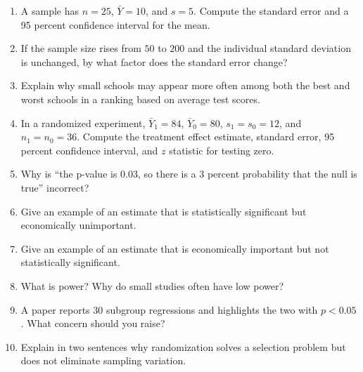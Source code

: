 \begin{enumerate}
  \item A sample has $n=25$, $\bar{Y}=10$, and $s=5$. Compute the standard
  error and a 95 percent confidence interval for the mean.
  \item If the sample size rises from $50$ to $200$ and the individual standard
  deviation is unchanged, by what factor does the standard error change?
  \item Explain why small schools may appear more often among both the best and
  worst schools in a ranking based on average test scores.
  \item In a randomized experiment, $\bar{Y}_1=84$, $\bar{Y}_0=80$,
  $s_1=s_0=12$, and $n_1=n_0=36$. Compute the treatment effect estimate,
  standard error, 95 percent confidence interval, and $z$ statistic for testing
  zero.
  \item Why is ``the p-value is 0.03, so there is a 3 percent probability that
  the null is true'' incorrect?
  \item Give an example of an estimate that is statistically significant but
  economically unimportant.
  \item Give an example of an estimate that is economically important but not
  statistically significant.
  \item What is power? Why do small studies often have low power?
  \item A paper reports 30 subgroup regressions and highlights the two with
  $p<0.05$. What concern should you raise?
  \item Explain in two sentences why randomization solves a selection problem
  but does not eliminate sampling variation.
\end{enumerate}


